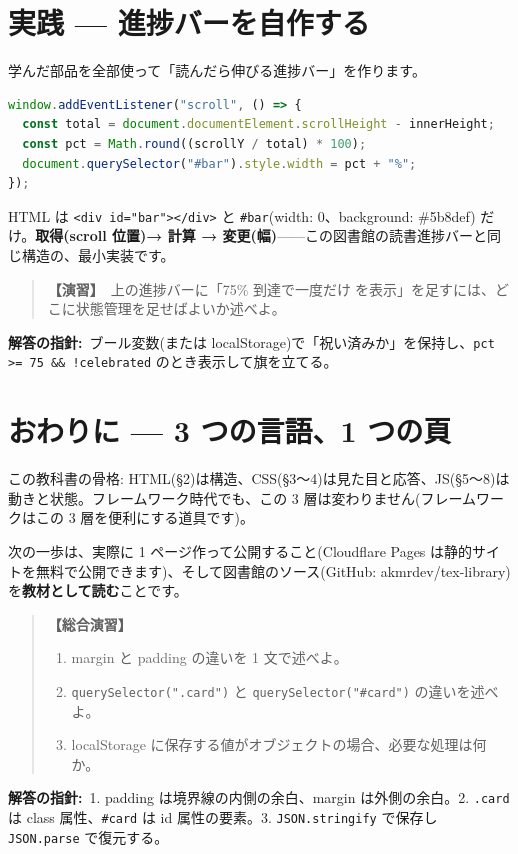 \documentclass{article}
\begin{document}
\section{実践 — 進捗バーを自作する}

学んだ部品を全部使って「読んだら伸びる進捗バー」を作ります。

\begin{lstlisting}[language=JavaScript]
window.addEventListener("scroll", () => {
  const total = document.documentElement.scrollHeight - innerHeight;
  const pct = Math.round((scrollY / total) * 100);
  document.querySelector("#bar").style.width = pct + "%";
});
\end{lstlisting}

HTML は \texttt{<div id="bar"></div>} と \texttt{\#bar}(width: 0、background: \#5b8def) だけ。\textbf{取得(scroll 位置)→ 計算 → 変更(幅)}——この図書館の読書進捗バーと同じ構造の、最小実装です。

\begin{quote}
\textbf{【演習】}\ 上の進捗バーに「75\% 到達で一度だけ🎉を表示」を足すには、どこに状態管理を足せばよいか述べよ。
\end{quote}

\textbf{解答の指針:}\ ブール変数(または localStorage)で「祝い済みか」を保持し、\texttt{pct >= 75 \&\& !celebrated} のとき表示して旗を立てる。

\section{おわりに — 3 つの言語、1 つの頁}

この教科書の骨格: HTML(§2)は構造、CSS(§3〜4)は見た目と応答、JS(§5〜8)は動きと状態。フレームワーク時代でも、この 3 層は変わりません(フレームワークはこの 3 層を便利にする道具です)。

次の一歩は、実際に 1 ページ作って公開すること(Cloudflare Pages は静的サイトを無料で公開できます)、そして図書館のソース(GitHub: akmrdev/tex-library)を\textbf{教材として読む}ことです。

\begin{quote}
\textbf{【総合演習】}
\begin{enumerate}
\item margin と padding の違いを 1 文で述べよ。
\item \texttt{querySelector(".card")} と \texttt{querySelector("\#card")} の違いを述べよ。
\item localStorage に保存する値がオブジェクトの場合、必要な処理は何か。
\end{enumerate}
\end{quote}

\textbf{解答の指針:}\ 1. padding は境界線の内側の余白、margin は外側の余白。2. \texttt{.card} は class 属性、\texttt{\#card} は id 属性の要素。3. \texttt{JSON.stringify} で保存し \texttt{JSON.parse} で復元する。
\end{document}
